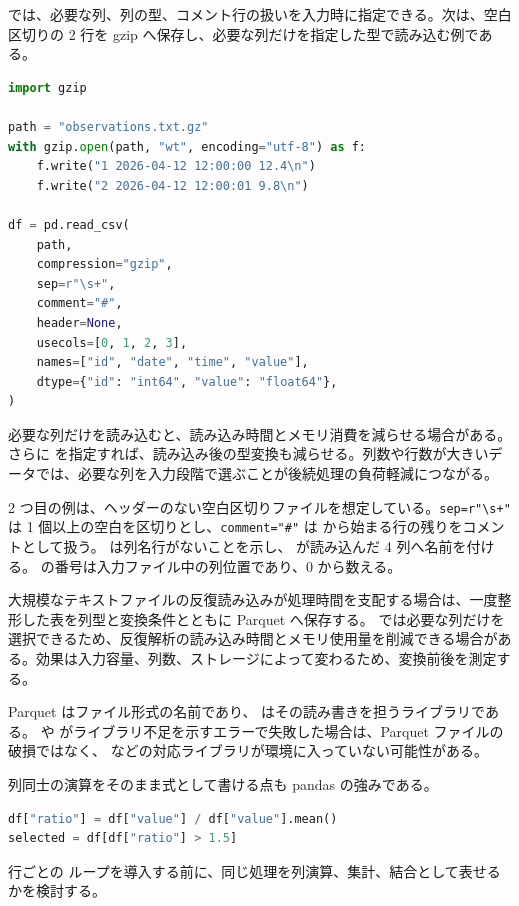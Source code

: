  では、必要な列、列の型、コメント行の扱いを入力時に指定できる。次は、空白区切りの 2 行を gzip へ保存し、必要な列だけを指定した型で読み込む例である。

\begin{lstlisting}[language=Python]
import gzip

path = "observations.txt.gz"
with gzip.open(path, "wt", encoding="utf-8") as f:
    f.write("1 2026-04-12 12:00:00 12.4\n")
    f.write("2 2026-04-12 12:00:01 9.8\n")

df = pd.read_csv(
    path,
    compression="gzip",
    sep=r"\s+",
    comment="#",
    header=None,
    usecols=[0, 1, 2, 3],
    names=["id", "date", "time", "value"],
    dtype={"id": "int64", "value": "float64"},
)
\end{lstlisting}

必要な列だけを読み込むと、読み込み時間とメモリ消費を減らせる場合がある。さらに  を指定すれば、読み込み後の型変換も減らせる。列数や行数が大きいデータでは、必要な列を入力段階で選ぶことが後続処理の負荷軽減につながる。

2 つ目の例は、ヘッダーのない空白区切りファイルを想定している。\verb|sep=r"\s+"| は 1 個以上の空白を区切りとし、\verb|comment="#"| は \code{\#} から始まる行の残りをコメントとして扱う。 は列名行がないことを示し、 が読み込んだ 4 列へ名前を付ける。 の番号は入力ファイル中の列位置であり、0 から数える。

大規模なテキストファイルの反復読み込みが処理時間を支配する場合は、一度整形した表を列型と変換条件とともに Parquet へ保存する。 では必要な列だけを選択できるため、反復解析の読み込み時間とメモリ使用量を削減できる場合がある。効果は入力容量、列数、ストレージによって変わるため、変換前後を測定する。

Parquet はファイル形式の名前であり、 はその読み書きを担うライブラリである。 や  がライブラリ不足を示すエラーで失敗した場合は、Parquet ファイルの破損ではなく、 などの対応ライブラリが環境に入っていない可能性がある。

列同士の演算をそのまま式として書ける点も pandas の強みである。

\begin{lstlisting}[language=Python]
df["ratio"] = df["value"] / df["value"].mean()
selected = df[df["ratio"] > 1.5]
\end{lstlisting}

行ごとの  ループを導入する前に、同じ処理を列演算、集計、結合として表せるかを検討する。



